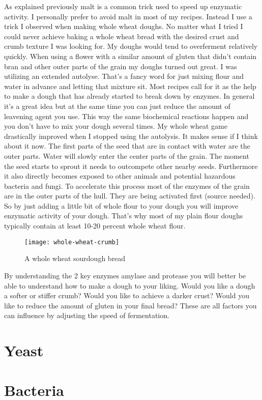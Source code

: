 As explained previously malt is a common trick used
to speed up enzymatic activity. I personally prefer
to avoid malt in most of my recipes. Instead I use
a trick I observed when making whole wheat doughs.
No matter what I tried I could never achieve baking
a whole wheat bread with the desired crust and crumb
texture I was looking for. My doughs would tend to
overferment relatively quickly. When using a flower
with a similar amount of gluten that didn't contain
bran and other outer parts of the grain my doughs turned
out great. I was utilizing an extended autolyse.
That's a fancy word for just mixing flour and water in
advance and letting that mixture sit. Most recipes
call for it as the help to make a dough that has already
started to break down by enzymes. In general it's a great
idea but at the same time you can just reduce the amount
of leavening agent you use. This way the same biochemical
reactions happen and you don't have to mix your dough
several times. My whole wheat game drastically improved
when I stopped using the autolysis. It makes sense if I
think about it now. The first parts of the seed that
are in contact with water are the outer parts. Water
will slowly enter the center parts of the grain. The
moment the seed starts to sprout it needs to outcompete
other nearby seeds. Furthermore it also directly becomes
exposed to other animals and potential hazardous bacteria
and fungi. To accelerate this process most of the enzymes
of the grain are in the outer parts of the hull. They
are being activated first (source needed). So by just
adding a little bit of whole flour to your dough you 
will improve enzymatic activity of your dough. That's
why most of my plain flour doughs typically contain
at least 10-20 percent whole wheat flour.

\begin{figure}
  \texttt{[image: whole-wheat-crumb]}
  \caption{A whole wheat sourdough bread}
  \label{whole-wheat-crumb}
\end{figure}



By understanding the 2 key enzymes amylase and protease
you will better be able to understand how to make a
dough to your liking. Would you like a dough a softer
or stiffer crumb? Would you like to achieve a darker crust?
Would you like to reduce the amount of gluten in your
final bread? These are all factors you can influence
by adjusting the speed of fermentation.




\section{Yeast}
\section{Bacteria}